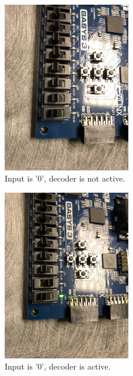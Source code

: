 \documentclass[11pt]{article}
\begin{document}
\begin{figure}[H]
\begin{center}
\includegraphics[width=0.5\textwidth]{report-images/Part2/IMG_0445.jpg}
\caption{Input is '0', decoder is not active.}
\label{fig:decoderImgOne}
\end{center}
\end{figure}

\begin{figure}[H]
\begin{center}
\includegraphics[width=0.5\textwidth]{report-images/Part2/IMG_0446.jpg}
\caption{Input is '0', decoder is active.}
\label{fig:decoderImgTwo}
\end{center}
\end{figure}
\end{document}
